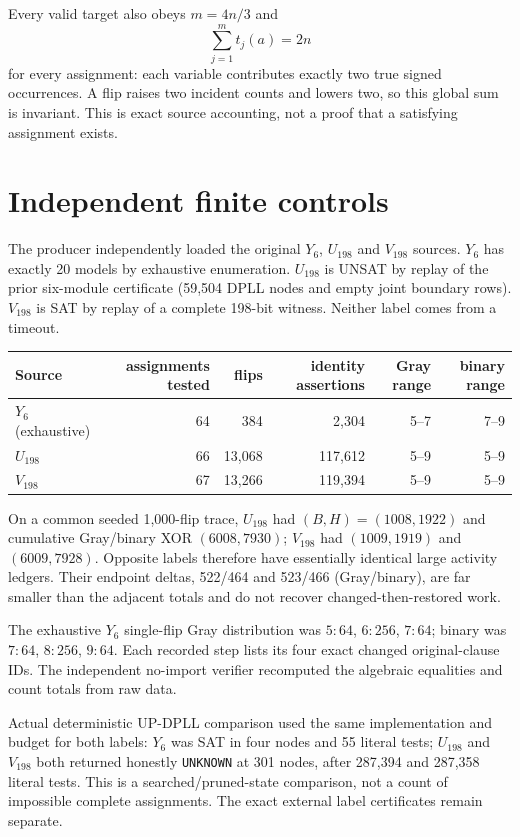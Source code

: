 \documentclass[11pt]{article}
\begin{document}
Every valid target also obeys $m=4n/3$ and
\[
 \sum_{j=1}^m t_j(a)=2n
\]
for every assignment: each variable contributes exactly two true signed occurrences.
A flip raises two incident counts and lowers two, so this global sum is invariant.  This
is exact source accounting, not a proof that a satisfying assignment exists.

\section{Independent finite controls}
The producer independently loaded the original $Y_6$, $U_{198}$ and $V_{198}$ sources.
$Y_6$ has exactly 20 models by exhaustive enumeration.  $U_{198}$ is UNSAT by replay of
the prior six-module certificate (59,504 DPLL nodes and empty joint boundary rows).
$V_{198}$ is SAT by replay of a complete 198-bit witness.  Neither label comes from a
timeout.

\begin{center}\small
\begin{tabular}{lrrrrr}
\toprule
Source & assignments tested & flips & identity assertions & Gray range & binary range\\\midrule
$Y_6$ (exhaustive)&64&384&2,304&5--7&7--9\\
$U_{198}$&66&13,068&117,612&5--9&5--9\\
$V_{198}$&67&13,266&119,394&5--9&5--9\\\bottomrule
\end{tabular}
\end{center}

On a common seeded 1,000-flip trace, $U_{198}$ had $(B,H)=(1008,1922)$ and cumulative
Gray/binary XOR $(6008,7930)$; $V_{198}$ had $(1009,1919)$ and $(6009,7928)$.  Opposite
labels therefore have essentially identical large activity ledgers.  Their endpoint
deltas, 522/464 and 523/466 (Gray/binary), are far smaller than the adjacent totals and
do not recover changed-then-restored work.

The exhaustive $Y_6$ single-flip Gray distribution was $5:64$, $6:256$, $7:64$;
binary was $7:64$, $8:256$, $9:64$.  Each recorded step lists its four exact changed
original-clause IDs.  The independent no-import verifier recomputed the algebraic
equalities and count totals from raw data.

Actual deterministic UP-DPLL comparison used the same implementation and budget for
both labels: $Y_6$ was SAT in four nodes and 55 literal tests; $U_{198}$ and $V_{198}$
both returned honestly \texttt{UNKNOWN} at 301 nodes, after 287,394 and 287,358 literal
tests.  This is a searched/pruned-state comparison, not a count of impossible complete
assignments.  The exact external label certificates remain separate.
\end{document}
